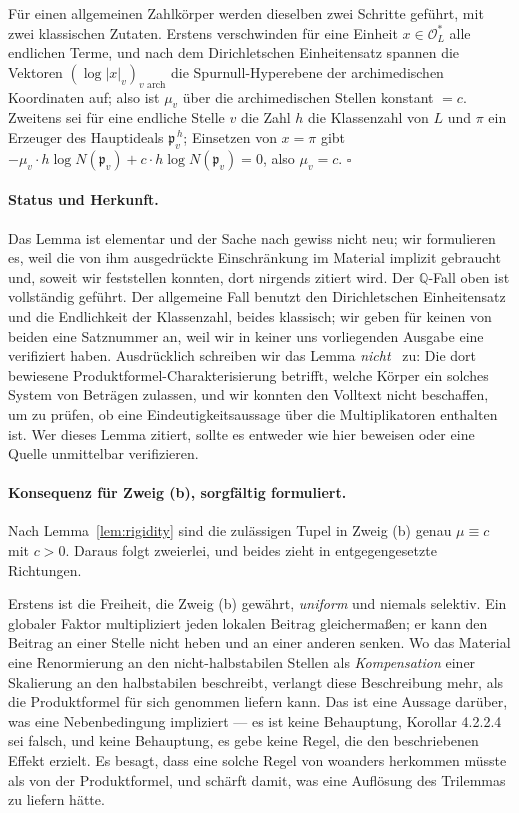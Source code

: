\documentclass[11pt,a4paper]{article}
\theoremstyle{definition}
\theoremstyle{plain}
\theoremstyle{definition}
\begin{document}
Für einen allgemeinen Zahlkörper werden dieselben zwei Schritte geführt, mit zwei
klassischen Zutaten. Erstens verschwinden für eine Einheit $x \in \mathcal{O}_L^*$
alle endlichen Terme, und nach dem Dirichletschen Einheitensatz spannen die
Vektoren $(\log|x|_v)_{v \text{ arch}}$ die Spurnull-Hyperebene der archimedischen
Koordinaten auf; also ist $\mu_v$ über die archimedischen Stellen konstant $= c$.
Zweitens sei für eine endliche Stelle $v$ die Zahl $h$ die Klassenzahl von $L$ und
$\pi$ ein Erzeuger des Hauptideals $\mathfrak{p}_v^{\,h}$; Einsetzen von $x = \pi$
gibt $-\mu_v \cdot h\log N(\mathfrak{p}_v) + c \cdot h\log N(\mathfrak{p}_v) = 0$,
also $\mu_v = c$. \hfill$\square$

\paragraph{Status und Herkunft.}
Das Lemma ist elementar und der Sache nach gewiss nicht neu; wir formulieren es,
weil die von ihm ausgedrückte Einschränkung im Material implizit gebraucht und,
soweit wir feststellen konnten, dort nirgends zitiert wird. Der
$\mathbb{Q}$-Fall oben ist vollständig geführt. Der allgemeine Fall benutzt den
Dirichletschen Einheitensatz und die Endlichkeit der Klassenzahl, beides
klassisch; wir geben für keinen von beiden eine Satznummer an, weil wir in keiner
uns vorliegenden Ausgabe eine verifiziert haben. Ausdrücklich schreiben wir das
Lemma \emph{nicht}~\cite{ArtinWhaples1945} zu: Die dort bewiesene
Produktformel-Charakterisierung betrifft, welche Körper ein solches System von
Beträgen zulassen, und wir konnten den Volltext nicht beschaffen, um zu prüfen, ob
eine Eindeutigkeitsaussage über die Multiplikatoren enthalten ist. Wer dieses
Lemma zitiert, sollte es entweder wie hier beweisen oder eine Quelle unmittelbar
verifizieren.

\paragraph{Konsequenz für Zweig (b), sorgfältig formuliert.}
Nach Lemma~\ref{lem:rigidity} sind die zulässigen Tupel in Zweig (b) genau
$\mu \equiv c$ mit $c > 0$. Daraus folgt zweierlei, und beides zieht in
entgegengesetzte Richtungen.

Erstens ist die Freiheit, die Zweig (b) gewährt, \emph{uniform} und niemals
selektiv. Ein globaler Faktor multipliziert jeden lokalen Beitrag gleichermaßen; er
kann den Beitrag an einer Stelle nicht heben und an einer anderen senken. Wo das
Material eine Renormierung an den nicht-halbstabilen Stellen als \emph{Kompensation}
einer Skalierung an den halbstabilen beschreibt, verlangt diese Beschreibung mehr,
als die Produktformel für sich genommen liefern kann. Das ist eine Aussage darüber,
was eine Nebenbedingung impliziert --- es ist keine Behauptung, Korollar 4.2.2.4 sei
falsch, und keine Behauptung, es gebe keine Regel, die den beschriebenen Effekt
erzielt. Es besagt, dass eine solche Regel von woanders herkommen müsste als von
der Produktformel, und schärft damit, was eine Auflösung des Trilemmas zu liefern
hätte.
\end{document}
